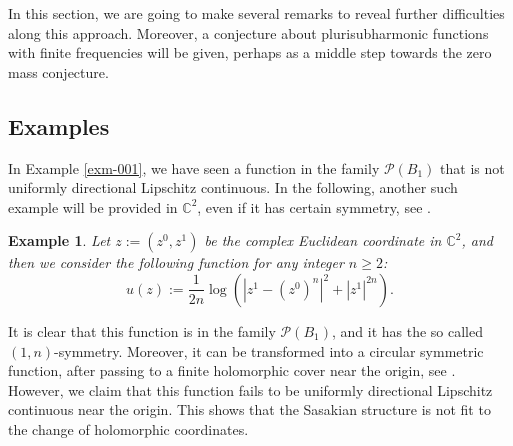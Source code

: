 \documentclass[a4paper,11pt]{amsart}
\numberwithin{equation}{section}
\newtheorem{example}[theorem]{Example}
\def\cP{{\mathcal P}}
\def\cP{{\mathcal P}}
\def\bC{{\mathbb C}}
\begin{document}
In this section, 
we are going to make several remarks to 
reveal further difficulties along this approach. 
Moreover, a conjecture about plurisubharmonic functions with finite frequencies will be given, 
perhaps as a middle step towards the zero mass conjecture.  



\subsection{Examples}
In Example \ref{exm-001},
we have seen a function in the family $\cP(B_1)$ that is not uniformly directional Lipschitz continuous. 
In the following, another such example will be provided in $\bC^2$, even if it has certain symmetry, see \cite{CG09}. 

\begin{example}
\label{exm-002}
Let $z:= (z^0, z^1)$ be the complex Euclidean coordinate in $\bC^2$, 
and then we consider the following function for any integer $n\geq2$:
\begin{equation}
\label{ex-010}
u(z):= \frac{1}{2n} \log\left( |z^1 - (z^0)^n |^2 + |z^1|^{2n} \right). 
\end{equation}
\end{example}
It is clear that this function is in the family $\cP(B_1)$, 
and it has the so called $(1,n)$-symmetry. 
Moreover, 
it can be transformed into a circular symmetric function, 
after passing to a finite holomorphic cover near the origin, see \cite{Li23}.
However, we claim that this function fails to be uniformly directional Lipschitz continuous near the origin. 
This shows that the Sasakian structure is not fit to
the change of holomorphic coordinates. 
\end{document}
